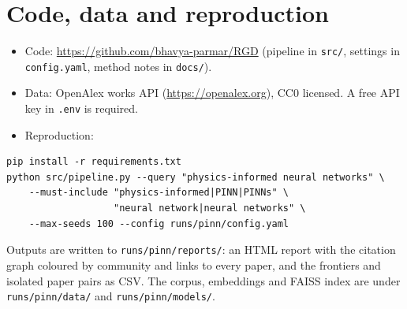 \documentclass[11pt,a4paper]{article}
\begin{document}
\section{Code, data and reproduction}
\label{sec:repro}

\begin{itemize}
  \item Code: \url{https://github.com/bhavya-parmar/RGD} (pipeline in \texttt{src/}, settings in \texttt{config.yaml}, method notes in \texttt{docs/}).
  \item Data: OpenAlex works API (\url{https://openalex.org}), CC0 licensed. A free API key in \texttt{.env} is required.
  \item Reproduction:
\end{itemize}
\begin{verbatim}
pip install -r requirements.txt
python src/pipeline.py --query "physics-informed neural networks" \
    --must-include "physics-informed|PINN|PINNs" \
                   "neural network|neural networks" \
    --max-seeds 100 --config runs/pinn/config.yaml
\end{verbatim}
Outputs are written to \texttt{runs/pinn/reports/}: an HTML report with the citation graph coloured by community and links to every paper, and the frontiers and isolated paper pairs as CSV. The corpus, embeddings and FAISS index are under \texttt{runs/pinn/data/} and \texttt{runs/pinn/models/}.
\end{document}
